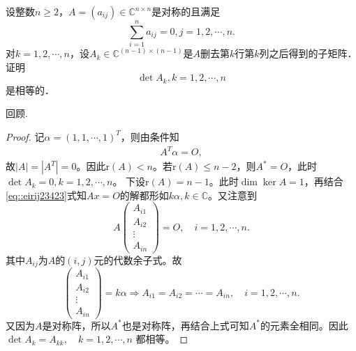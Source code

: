\documentclass[../../main.tex]{subfiles}
\begin{document}
\begin{example}
设整数$n \geqslant 2$，$A = (a_{ij}) \in \mathbb{C}^{n \times n}$是对称的且满足
$$\sum_{i=1}^n a_{ij} = 0, j = 1, 2, \cdots, n.$$
对$k = 1, 2, \cdots, n$，设$A_k \in \mathbb{C}^{(n-1) \times (n-1)}$是$A$删去第$k$行第$k$列之后得到的子矩阵．证明
$$\det A_k, k = 1, 2, \cdots, n$$
是相等的．
\end{example}
\begin{remark}
回顾.
\end{remark}
\begin{proof}
记$\alpha = (1,1,\cdots,1)^T$，则由条件知
\begin{align}
A^T \alpha = O, \label{eq::eirij23423}
\end{align}
故$|A| = |A^T| = 0$。因此$\text{r}(A) < n$。若$\text{r}(A) \leqslant n-2$，则$A^* = O$，此时
$\det A_k = 0, k = 1,2,\cdots,n$。
下设$\text{r}(A) = n-1$。此时$\dim \ker A = 1$，再结合\eqref{eq::eirij23423}式知$Ax = O$的解都形如$k\alpha, k \in \mathbb{C}$。又注意到
$$A\begin{pmatrix} A_{i1} \\ A_{i2} \\ \vdots \\ A_{in} \end{pmatrix} = O, \quad i = 1,2,\cdots,n.$$
其中$A_{ij}$为$A$的$(i,j)$元的代数余子式。故
$$\begin{pmatrix} A_{i1} \\ A_{i2} \\ \vdots \\ A_{in} \end{pmatrix} = k\alpha \Longrightarrow A_{i1} = A_{i2} = \cdots = A_{in}, \quad i = 1,2,\cdots,n.$$
又因为$A$是对称阵，所以$A^*$也是对称阵，再结合上式可知$A^*$的元素全相同。因此
$\det A_k = A_{kk}, \quad k = 1,2,\cdots,n$
都相等。

\end{proof}
\end{document}
